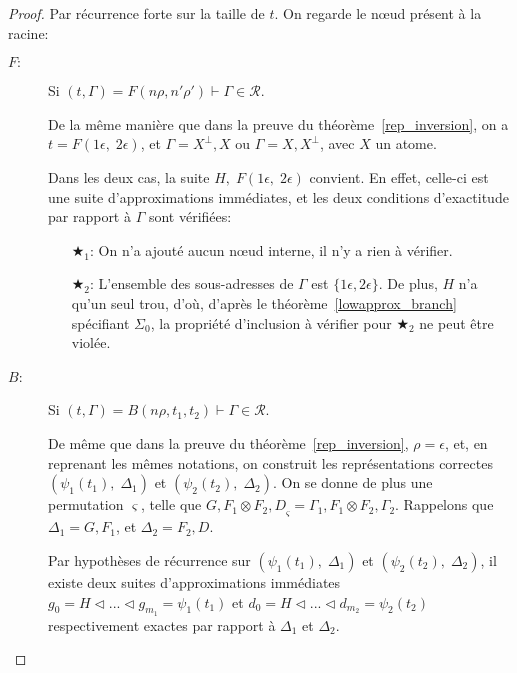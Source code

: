 \documentclass[11pt,a4paper]{article}
\theoremstyle{plain}
\theoremstyle{definition}
\theoremstyle{remark}
\newcommand*{\orth}{^\perp}
\newcommand*{\tensor}{\otimes}
\newcommand*{\someperm}{\varsigma}
\newcommand*{\sequent}{\Gamma}
\newcommand*{\sequentbis}{\Delta}
\newcommand*{\representations}{\ensuremath{\mathcal{R}}}
\newcommand*{\relapprox}{\ensuremath{\triangleleft}}
\newcommand*{\lowapprox}{\ensuremath{\Sigma_0}}
\newcommand*{\exactcond}{\bigstar_1}
\newcommand*{\exactcondbis}{\bigstar_2}
\begin{document}
\begin{proof}
    Par récurrence forte sur la taille de $t$. On regarde le n\oe ud présent à la racine:
    \begin{description}
        \item[$F:$] 
            Si $(t, \sequent) = F(n\rho, n'\rho') \vdash \sequent \in \representations$.
        
            De la même manière que dans la preuve du théorème~\ref{rep_inversion}, on a $t = F(1 \epsilon, \; 2 \epsilon)$, et $\sequent = X\orth, X$ ou $\sequent = X, X\orth$, avec $X$ un atome.
    
            Dans les deux cas, la suite $H, \; F(1 \epsilon, \; 2 \epsilon)$ convient. En effet, celle-ci est une suite d'approximations immédiates, et les deux conditions d'exactitude par rapport à $\sequent$ sont vérifiées:
    
            \begin{enumerate}
                \item[$\exactcond$:] On n'a ajouté aucun n\oe ud interne, il n'y a rien à vérifier.
    
                \item[$\exactcondbis$:] L'ensemble des sous-adresses de $\sequent$ est $\{ 1 \epsilon, 2 \epsilon \}$. De plus, $H$ n'a qu'un seul trou, d'où, d'après le théorème~\ref{lowapprox_branch} spécifiant $\lowapprox$, la propriété d'inclusion à vérifier pour $\exactcondbis$ ne peut être violée.
            \end{enumerate}

        \item[$B$:] 
            Si $(t, \sequent) = B(n\rho, t_1, t_2) \vdash \sequent \in \representations$.

            De même que dans la preuve du théorème~\ref{rep_inversion}, $\rho = \epsilon$, et, en reprenant les mêmes notations, on construit les représentations correctes $\left( \psi_1 \left( t_1 \right), \; \sequentbis_1 \right)$ et $\left( \psi_2 \left( t_2 \right), \; \sequentbis_2 \right)$. On se donne de plus une permutation $\someperm$, telle que ${G, F_1 \tensor F_2, D}_\someperm = \sequent_1, F_1 \tensor F_2, \sequent_2$. Rappelons que $\sequentbis_1 = G, F_1$, et $\sequentbis_2 = F_2, D$.
    
            Par hypothèses de récurrence sur $\left( \psi_1 \left( t_1 \right), \; \sequentbis_1 \right)$ et $\left( \psi_2 \left( t_2 \right), \; \sequentbis_2 \right)$, il existe deux suites d'approximations immédiates $g_0 = H \relapprox ... \relapprox g_{m_1} = \psi_1 \left( t_1 \right)$ et $d_0 = H \relapprox ... \relapprox d_{m_2} = \psi_2 \left( t_2 \right)$ respectivement exactes par rapport à $\sequentbis_1$ et $\sequentbis_2$.
    

\end{description}
\end{proof}
\end{document}
